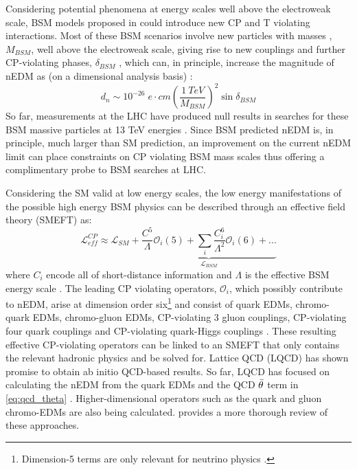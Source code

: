 Considering potential phenomena at energy scales well above the electroweak scale, BSM models proposed in \cite{Dubbers2011, Chupp1987} could introduce new CP and T violating interactions. Most of these BSM scenarios involve new particles with masses , $M_{BSM}$, well above the electroweak scale, giving rise to new couplings and further CP-violating phases, $\delta_{BSM}$ , which can, in principle, increase the magnitude of nEDM as (on a dimensional analysis basis) \cite{Alarcon2022, Chupp2019, Morrissey2012, Dubbers2011, Engel2013}: 
\begin{equation}
    d_{n} \sim 10^{-26}\; e \cdot cm\left(\frac{1~TeV}{M_{BSM}}\right)^2 \sin{\delta_{BSM}}
\end{equation}  
So far, measurements at the LHC have produced null results in searches for these BSM massive particles at 13 TeV energies \cite{PDG2022}. Since BSM predicted nEDM is, in principle, much larger than SM prediction, an improvement on the current nEDM limit can place constraints on CP violating BSM mass scales thus offering a complimentary probe to BSM searches at LHC. 

Considering the SM valid at low energy scales, the low energy manifestations of the possible high energy BSM physics can be described through an effective field theory (SMEFT) as:
\begin{equation}
    \mathcal{L}_{eff}^{CP} \approx \mathcal{L}_{SM} +  \underbrace{ \frac{ C^5 }{\Lambda} \mathcal{O}_i(5) + \sum_i \frac{ C_{i}^6 }{\Lambda^2} \mathcal{O}_i(6) + ... }_{\mathcal{L}_{BSM} }
\end{equation}
where $C_i$ encode all of short-distance information and $\Lambda$ is the effective BSM energy scale \cite{Chupp2019}. The leading CP violating operators, $\mathcal{O}_i$, which possibly contribute to nEDM, arise at dimension order six\footnote{Dimension-5 terms are only relevant for neutrino physics \cite{Agostini2023}.} and consist of quark EDMs, chromo-quark EDMs, chromo-gluon EDMs, CP-violating 3 gluon couplings, CP-violating four quark couplings and CP-violating quark-Higgs couplings \cite{Yamanaka2021}. These resulting effective CP-violating operators can be linked to an SMEFT that only contains the relevant hadronic physics and be solved for. Lattice QCD (LQCD) has shown promise to obtain ab initio QCD-based results. So far, LQCD has focused on calculating the nEDM from the quark EDMs and the QCD $\Bar{\theta}$ term in \cref{eq:qcd_theta} \cite{Alexandrou2021, Bhattacharya2021}. Higher-dimensional operators such as the quark and gluon chromo-EDMs are also being calculated. \cite{Shindler2021} provides a more thorough review of these approaches.

